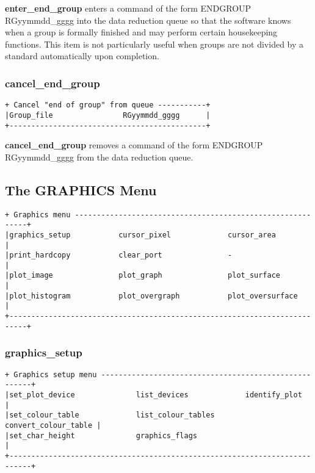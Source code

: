 {{\bf enter\_end\_group} enters a command of the form 
{\sf ENDGROUP RGyymmdd\_gggg} into the data reduction queue so that
the software knows when a group is formally finished and may perform certain
housekeeping functions. This item is not particularly useful when groups 
are not divided by a standard automatically upon completion.

\subsubsection{cancel\_end\_group}
\label{cancel_end_group}
\begin{verbatim}
+ Cancel "end of group" from queue -----------+
|Group_file                RGyymmdd_gggg      |
+---------------------------------------------+
\end{verbatim}

{\bf cancel\_end\_group} removes a command of the form 
{\sf ENDGROUP RGyymmdd\_gggg} from the data reduction queue.

\subsection{The GRAPHICS Menu}
\label{the_graphics_menu}
\begin{verbatim}
+ Graphics menu -----------------------------------------------------------+
|graphics_setup           cursor_pixel             cursor_area             |
|print_hardcopy           clear_port               -                       |
|plot_image               plot_graph               plot_surface            |
|plot_histogram           plot_overgraph           plot_oversurface        |
+--------------------------------------------------------------------------+
\end{verbatim}

\subsubsection{graphics\_setup}
\label{graphics_setup}
\begin{verbatim}
+ Graphics setup menu ------------------------------------------------------+
|set_plot_device              list_devices             identify_plot        |
|set_colour_table             list_colour_tables       convert_colour_table |
|set_char_height              graphics_flags                                |
+---------------------------------------------------------------------------+
\end{verbatim}

}
